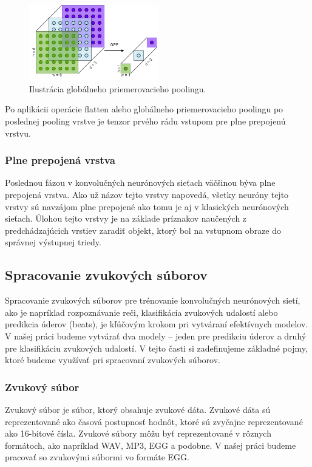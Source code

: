 \begin{figure}[H]
  \centerline{\includegraphics[width=0.5\textwidth]{images/gap.drawio.png}}
  \caption{Ilustrácia globálneho priemerovacieho poolingu.}
  \label{fig:gap}
\end{figure}

Po aplikácii operácie flatten alebo globálneho priemerovacieho poolingu po poslednej pooling vrstve je tenzor prvého rádu vstupom pre plne prepojenú vrstvu.

\subsubsection{Plne prepojená vrstva}

Poslednou fázou v konvolučných neurónových sieťach väčšinou býva plne prepojená
vrstva. Ako už názov tejto vrstvy napovedá, všetky neuróny tejto vrstvy sú navzájom
plne prepojené ako tomu je aj v klasických neurónových sieťach. Úlohou tejto vrstvy je
na základe príznakov naučených z predchádzajúcich vrstiev zaradiť objekt, ktorý bol
na vstupnom obraze do správnej výstupnej triedy.

\subsection{Spracovanie zvukových súborov}

Spracovanie zvukových súborov pre trénovanie konvolučných neurónových sietí, ako je napríklad rozpoznávanie reči, klasifikácia zvukových udalostí alebo predikcia úderov (beats), je kľúčovým krokom pri vytváraní efektívnych modelov. V našej práci budeme vytvárať dva modely – jeden pre predikciu úderov a druhý pre klasifikáciu zvukových udalostí. V tejto časti si zadefinujeme základné pojmy, ktoré budeme využívať pri spracovaní zvukových súborov.

\subsubsection{Zvukový súbor}

Zvukový súbor je súbor, ktorý obsahuje zvukové dáta. Zvukové dáta sú reprezentované ako časová postupnosť hodnôt, ktoré sú zvyčajne reprezentované ako 16-bitové čísla. Zvukové súbory môžu byť reprezentované v rôznych formátoch, ako napríklad WAV, MP3, EGG a podobne. V našej práci budeme pracovať so zvukovými súbormi vo formáte EGG.

